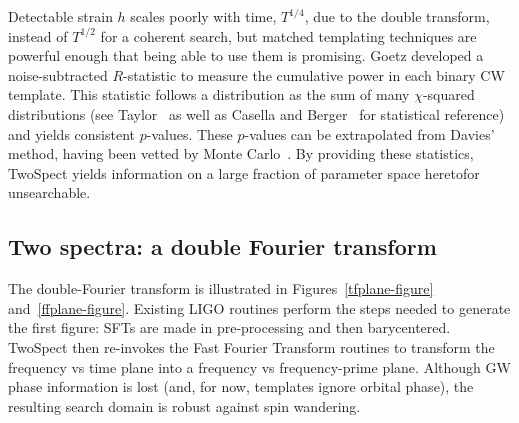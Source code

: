 Detectable strain $h$ scales poorly with time, $T^{1/4}$, due to the double transform, instead of $T^{1/2}$ for a coherent search, but matched templating techniques are powerful enough that being able to use them is promising.
Goetz developed a noise-subtracted $R$-statistic to measure the cumulative power in each binary CW template.
This statistic follows a distribution as the sum of many $\chi$-squared distributions (see Taylor~\cite{taylor} as well as Casella and Berger~\cite{CasellaBerger2001} for statistical reference) and yields consistent $p$-values.
These $p$-values can be extrapolated from Davies' method, having been vetted by Monte Carlo~\cite{GoetzTwoSpectMethods2011}.
By providing these statistics, TwoSpect yields information on a large fraction of parameter space heretofor unsearchable.



            \subsection{Two spectra: a double Fourier transform}
            \label{two_spectra}


The double-Fourier transform is illustrated in Figures~\ref{tfplane-figure} and~\ref{ffplane-figure}.
Existing LIGO routines perform the steps needed to generate the first figure: SFTs are made in pre-processing and then barycentered.
TwoSpect then re-invokes the Fast Fourier Transform routines to transform the frequency vs time plane into a frequency vs frequency-prime plane.
Although GW phase information is lost (and, for now, templates ignore orbital phase), the resulting search domain is robust against spin wandering.

